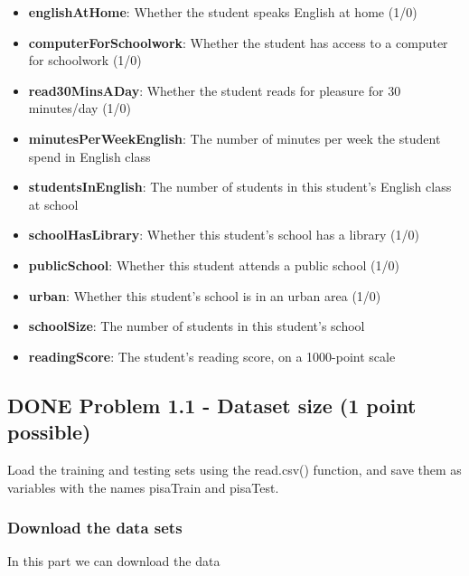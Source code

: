 \documentclass[letterpaper, 9pt, onecolumn, twoside, technote, final]{IEEEtran}
\begin{document}
\begin{itemize}
\item \textbf{englishAtHome}: Whether the student speaks English at home (1/0)

\item \textbf{computerForSchoolwork}: Whether the student has access to a
computer for schoolwork (1/0)

\item \textbf{read30MinsADay}: Whether the student reads for pleasure for 30
minutes/day (1/0)

\item \textbf{minutesPerWeekEnglish}: The number of minutes per week the student
spend in English class

\item \textbf{studentsInEnglish}: The number of students in this student's
English class at school

\item \textbf{schoolHasLibrary}: Whether this student's school has a library
(1/0)

\item \textbf{publicSchool}: Whether this student attends a public school (1/0)

\item \textbf{urban}: Whether this student's school is in an urban area (1/0)

\item \textbf{schoolSize}: The number of students in this student's school

\item \textbf{readingScore}: The student's reading score, on a 1000-point scale
\end{itemize}

\subsection{{\bfseries\sffamily DONE} Problem 1.1 - Dataset size (1 point possible)}
\label{sec-2-1}
Load the training and testing sets using the read.csv() function, and
save them as variables with the names pisaTrain and pisaTest.

\subsubsection{Download the data sets}
\label{sec-2-1-1}

In this part we can download the data
\end{document}
